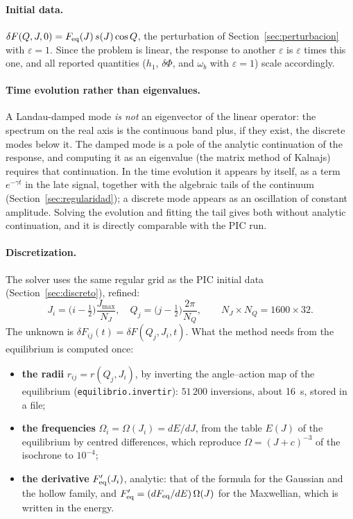 \documentclass[11pt,a4paper]{article}
\begin{document}
\paragraph{Initial data.} $\delta F(Q,J,0)=F_{\rm eq}(J)\,s(J)\cos Q$, the perturbation of
Section~\ref{sec:perturbacion} with $\varepsilon=1$. Since the problem is linear, the response to
another $\varepsilon$ is $\varepsilon$ times this one, and all reported quantities ($h_1$, $\delta\Phi$, and
$\omega_b$ with $\varepsilon=1$) scale accordingly.

\paragraph{Time evolution rather than eigenvalues.} A Landau-damped mode \emph{is not} an
eigenvector of the linear operator: the spectrum on the real axis is the continuous band
plus, if they exist, the discrete modes below it. The damped mode is a pole of the
analytic continuation of the response, and computing it as an eigenvalue (the matrix
method of Kalnajs) requires that continuation. In the time evolution it appears by
itself, as a term $e^{-\gamma t}$ in the late signal, together with the algebraic tails of the
continuum (Section~\ref{sec:regularidad}); a discrete mode appears as an oscillation of
constant amplitude. Solving the evolution and fitting the tail gives both without
analytic continuation, and it is directly comparable with the PIC run.

\paragraph{Discretization.} The solver uses the same regular grid as the PIC initial data
(Section~\ref{sec:discreto}), refined:
\[
  J_i=\big(i-\tfrac12\big)\frac{J_{\max}}{N_J},\quad
  Q_j=\big(j-\tfrac12\big)\frac{2\pi}{N_Q},\qquad N_J\times N_Q=1600\times32 .
\]
The unknown is $\delta F_{ij}(t)=\delta F(Q_j,J_i,t)$. What the method needs from the equilibrium is
computed once:
\begin{itemize}
\item \textbf{the radii} $r_{ij}=r(Q_j,J_i)$, by inverting the angle--action map of the
equilibrium (\texttt{equilibrio.\allowbreak invertir}): $51\,200$ inversions, about \SI{16}{s},
stored in a file;
\item \textbf{the frequencies} $\Omega_i=\Omega(J_i)=dE/dJ$, from the table $E(J)$ of the equilibrium
by centred differences, which reproduce $\Omega=(J+c)^{-3}$ of the isochrone to $10^{-4}$;
\item \textbf{the derivative} $F_{\rm eq}'(J_i)$, analytic: that of the formula for the Gaussian
and the hollow family, and $F_{\rm eq}'=(dF_{\rm eq}/dE)\,\Omega(J)$ for the Maxwellian, which is
written in the energy.
\end{itemize}
\end{document}
